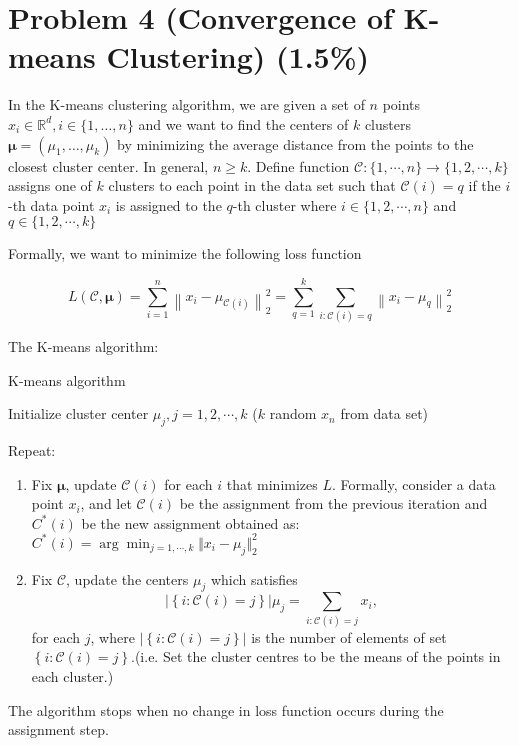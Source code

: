 \documentclass{article}
\begin{document}
\section*{Problem 4 (Convergence of K-means Clustering)
(1.5\%)}
 In the K-means clustering algorithm, we are given a set of $n$ points $x_i \in \mathbb{R}^d, i \in\{1, \ldots, n\}$ and we want to find the centers of $k$ clusters $\boldsymbol{\mu}=\left(\mu_1, \ldots, \mu_k\right)$ by minimizing the average distance from the points to the closest cluster center. In general, $n\geq k$. Define function $\mathcal{C} :\{1, \cdots, n\}\rightarrow \{1, 2,\cdots, k\}$ assigns one of $k$ clusters to each point in the data set such that $\mathcal{C}(i) = q$ if the $i$-th data point $x_i$ is assigned to the $q$-th cluster where $i\in\{1, 2, \cdots, n\}$ and $q\in\{1, 2, \cdots, k\}$

Formally, we want to minimize the following loss function

$$
L(\mathcal{C}, \boldsymbol{\mu})=\sum_{i=1}^n\left\|x_i-\mu_{\mathcal{C}(i)}\right\|_2^2 = \sum_{q=1}^{k}\sum_{i:\mathcal{C}(i)=q}\left\|x_i-\mu_{q}\right\|_2^2
$$

The K-means algorithm:
\begin{algorithm}
\caption{K-means algorithm}

Initialize cluster center $\mu_j, j = 1, 2, \cdots, k$ ($k$ random $x_n$ from data set)

Repeat:
\begin{enumerate}
    \item Fix $\boldsymbol{\mu}$, update $\mathcal{C}(i)$ for each $i$ that minimizes $L$. Formally, consider a data point $x_i$, and let $\mathcal{C}(i)$ be the  assignment from the previous iteration and $C^*(i)$ be the new assignment obtained as: $C^*(i)= \arg\min_{j=1, \cdots, k} \Vert x_i - \mu_j\Vert^2_2$
    \item Fix $\mathcal{C}$, update the centers $\mu_j$ which satisfies 
$$\left|\left\{i: \mathcal{C}(i)=j\right\}\right|\mu_j= 
\sum_{i: \mathcal{C}(i)=j} x_i, 
$$for each $j$, where $\left|\left\{i: \mathcal{C}(i)=j\right\}\right|$ is the number of elements of set $\left\{i: \mathcal{C}(i)=j\right\}$.(i.e. Set the cluster centres to be the means of the points in each cluster.)
\end{enumerate}
\end{algorithm}

The algorithm stops when no change in loss function occurs during the assignment step.
\end{document}
